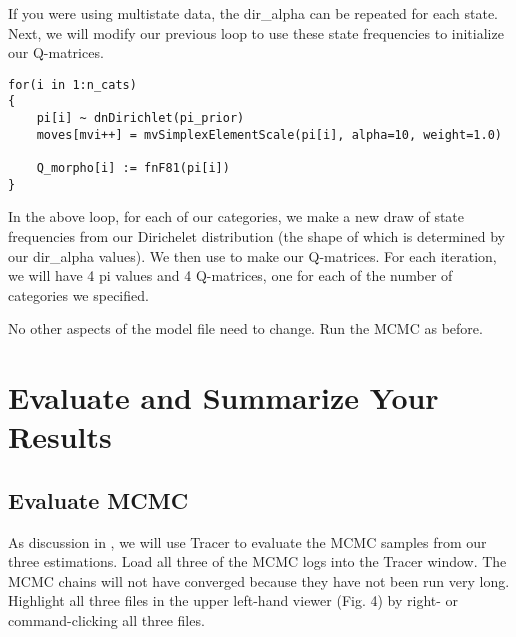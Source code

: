 If you were using multistate data, the dir\_alpha can be repeated for each state.
Next, we will modify our previous loop to use these state frequencies to initialize our Q-matrices.

{\tt \begin{snugshade*}
\begin{lstlisting}for(i in 1:n_cats)
{
	pi[i] ~ dnDirichlet(pi_prior)
    moves[mvi++] = mvSimplexElementScale(pi[i], alpha=10, weight=1.0) 
    
    Q_morpho[i] := fnF81(pi[i])
}
\end{lstlisting}
\end{snugshade*}}

In the above loop, for each of our categories, we make a new draw of state frequencies from our Dirichelet distribution (the shape of which is determined by our dir\_alpha values).  
We then use  to make our Q-matrices.
For each  iteration, we will have 4 pi values and 4 Q-matrices, one for each of the number of categories we specified. \par

No other aspects of the model file need to change.
Run the MCMC as before. \par

\bigskip
\section{Evaluate and Summarize Your Results}\label{sec:trace}


\medskip
\subsection{Evaluate MCMC}\label{subsub:Exercise-EvalMCMC}

As discussion in , we will use Tracer to evaluate the MCMC samples from our three estimations. 
Load all three of the MCMC logs into the Tracer window.
The MCMC chains will not have converged because they have not been run very long. 
Highlight all three files in the upper left-hand viewer (Fig. 4) by right- or command-clicking all three files. \par

\begin{figure}[h!]
\label{fig:module-gm}
\end{figure}


